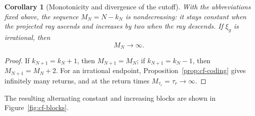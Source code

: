 \documentclass[11pt]{amsart}
\theoremstyle{definition}
\theoremstyle{plain}
\newtheorem{corollary}[definition]{Corollary}
\begin{document}
\begin{corollary}[Monotonicity and divergence of the cutoff]
\label{cor:MN-diverges}
With the abbreviations fixed above, the sequence \(M_N=N-k_N\) is
nondecreasing: it stays constant when the
projected ray ascends and increases by two when the ray descends.  If
\(\xi_g\) is irrational, then
\[
M_N\longrightarrow\infty.
\]
\end{corollary}

\begin{proof}
If \(k_{N+1}=k_N+1\), then \(M_{N+1}=M_N\); if
\(k_{N+1}=k_N-1\), then \(M_{N+1}=M_N+2\).
For an irrational endpoint, Proposition~\ref{prop:cf-coding} gives infinitely
many returns, and at the return times \(M_{\tau_r}=\tau_r\to\infty\).
\end{proof}

The resulting alternating constant and increasing blocks are shown in
Figure~\ref{fig:cf-blocks}.
\end{document}
